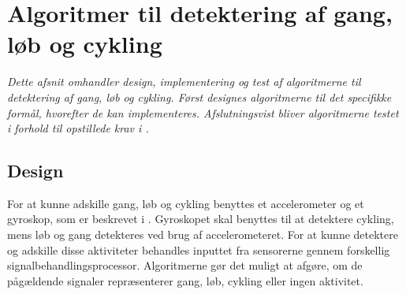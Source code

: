 \section{Algoritmer til detektering af gang, løb og cykling}
\textit{Dette afsnit omhandler design, implementering og test af algoritmerne til detektering af gang, løb og cykling. Først designes algoritmerne til det specifikke formål, hvorefter de kan implementeres. Afslutningsvist bliver algoritmerne testet i forhold til opstillede krav i .} 

\subsection{Design}
For at kunne adskille gang, løb og cykling benyttes et accelerometer og et gyroskop, som er beskrevet i . Gyroskopet skal benyttes til at detektere cykling, mens løb og gang detekteres ved brug af accelerometeret. For at kunne detektere og adskille disse aktiviteter behandles inputtet fra sensorerne gennem forskellig signalbehandlingsprocessor. Algoritmerne gør det muligt at afgøre, om de pågældende signaler repræsenterer gang, løb, cykling eller ingen aktivitet. 

